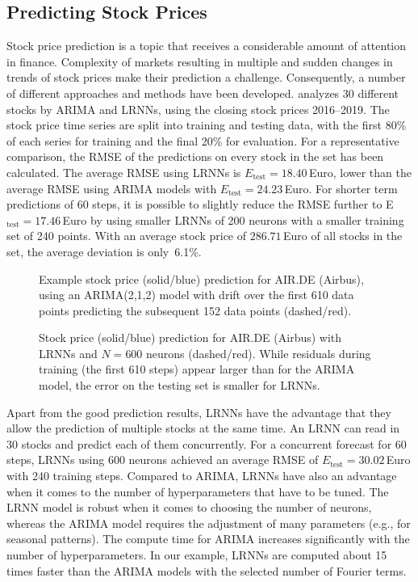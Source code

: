\documentclass[twoside,11pt]{article}
\theoremstyle{definition}
\newcommand{\euro}{Euro}
\begin{document}
\subsection{Predicting Stock Prices}\label{stock}

Stock price prediction is a topic that receives a considerable amount of
attention in finance. Complexity of markets resulting in multiple and sudden
changes in trends of stock prices make their prediction a challenge.
Consequently, a number of different approaches and methods have been developed.
\citet{Lit20} analyzes $30$ different stocks by ARIMA and LRNNs, using the
closing stock prices 2016--2019. The stock price time series are split into
training and testing data, with the first 80\% of each series for training and the
final 20\% for evaluation. For a representative comparison, the RMSE of the
predictions on every stock in the set has been calculated. The average RMSE
using LRNNs is $E_\mathrm{test}=18.40${\,\euro}, lower than the average RMSE
using ARIMA models with $E_\mathrm{test}=24.23${\,\euro}. For shorter term
predictions of 60 steps, it is possible to slightly reduce the RMSE further to
E$_\mathrm{test}=17.46${\,\euro} by using smaller LRNNs of 200 neurons with a
smaller training set of 240 points. With an average stock price of
$286.71${\,\euro} of all stocks in the set, the average deviation is only~6.1\%.

\begin{figure}
\begin{minipage}[t]{0.48\textwidth}
  \caption{Example stock price (solid/blue) prediction for AIR.DE (Airbus), using an ARIMA(2,1,2)
	model with drift over the first 610 data points predicting the
	subsequent 152 data points (dashed/red).}
  \label{arima}
\end{minipage}
  \hfill%
\begin{minipage}[t]{0.48\textwidth}
  \caption{Stock price (solid/blue) prediction for AIR.DE (Airbus) with LRNNs and $N=600$ neurons (dashed/red).
	While residuals during training (the first 610 steps) appear larger than
	for the ARIMA model, the error on the testing set is smaller for LRNNs.}
  \label{LRNN}
\end{minipage}
\end{figure}

Apart from the good prediction results, LRNNs have the advantage that they allow
the prediction of multiple stocks at the same time. An LRNN can read in 30
stocks and predict each of them concurrently. For a concurrent forecast for 60
steps, LRNNs using 600 neurons achieved an average RMSE of
$E_\mathrm{test}=30.02${\,\euro} with 240 training steps. Compared to ARIMA,
LRNNs have also an advantage when it comes to the number of hyperparameters that
have to be tuned. The LRNN model is robust when it comes to choosing the number
of neurons, whereas the ARIMA model requires the adjustment of many parameters
(e.g., for seasonal patterns). The compute time for ARIMA increases
significantly with the number of hyperparameters. In our example, LRNNs are
computed about 15 times faster than the ARIMA models with the selected number of
Fourier terms.
\end{document}
